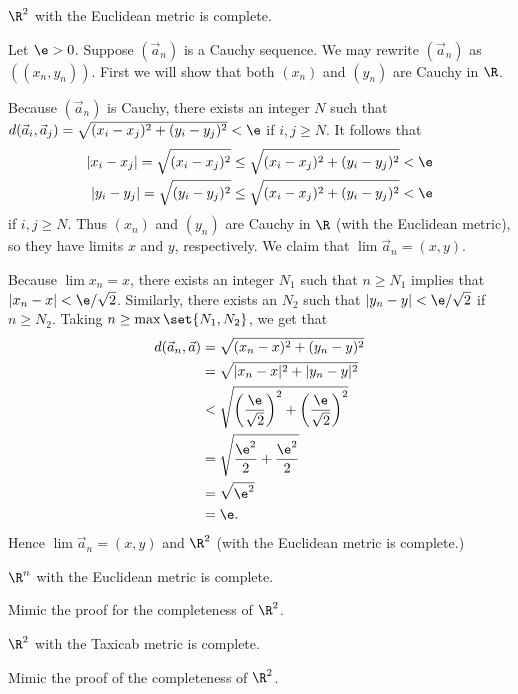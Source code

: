 \documentclass[class=article, crop=false]{standalone}
\begin{document}
\begin{fact}
    $\R^2$ with the Euclidean metric is complete.
\end{fact}
\begin{pf}
    Let $\e > 0$. Suppose $(\vec a_n)$ is a Cauchy sequence. We may rewrite $(\vec a_n)$ as $((x_n, y_n))$. First we will show that both $(x_n)$ and $(y_n)$ are Cauchy in $\R$.

    Because $(\vec a_n)$ is Cauchy, there exists an integer $N$ such that $d(\vec a_i, \vec a_j) = \sqrt{(x_i-x_j)^2+(y_i-y_j)^2} < \e$ if $i,j \geq N$. It follows that
        \begin{align*}
            |x_i-x_j| = \sqrt{(x_i-x_j)^2} \leq \sqrt{(x_i-x_j)^2+(y_i-y_j)^2} &< \e \\
            |y_i-y_j| = \sqrt{(y_i-y_j)^2} \leq \sqrt{(x_i-x_j)^2+(y_i-y_j)^2} &< \e
        \end{align*}
    if $i,j \geq N$. Thus $(x_n)$ and $(y_n)$ are Cauchy in $\R$ (with the Euclidean metric), so they have limits $x$ and $y$, respectively. We claim that $\lim \vec a_n = (x,y)$.

    Because $\lim x_n = x$, there exists an integer $N_1$ such that $n \geq N_1$ implies that $|x_n-x| < \e/\sqrt 2$. Similarly, there exists an $N_2$ such that $|y_n-y| < \e/\sqrt 2$ if $n \geq N_2$. Taking $n \geq \max \set{N_1, N_2}$, we get that
        \begin{align*}
            d(\vec a_n, \vec a) &= \sqrt{(x_n-x)^2 + (y_n-y)^2} \\
                &= \sqrt{|x_n-x|^2+|y_n-y|^2} \\
                &< \sqrt{ \left(\frac{\e}{\sqrt 2} \right)^2 + \left(\frac{\e}{\sqrt 2} \right)^2} \\
                &= \sqrt{\frac{\e^2}{2} + \frac{\e^2}{2}} \\
                &= \sqrt{\e^2} \\
                &= \e.
        \end{align*}
     Hence $\lim \vec a_n = (x,y)$ and $\R^2$ (with the Euclidean metric is complete.)
\end{pf}
\begin{coro}
    $\R^n$ with the Euclidean metric is complete.
\end{coro}
\begin{pf}
    Mimic the proof for the completeness of $\R^2$.
\end{pf}

\begin{fact}
    $\R^2$ with the Taxicab metric is complete.
\end{fact}
\begin{pf}
    Mimic the proof of the completeness of $\R^2$.
\end{pf}
\end{document}
